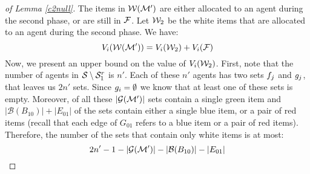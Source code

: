 \begin{proof}[of Lemma \ref{c2null}]
The items in $\mathcal{W}(\mathcal{M}')$ are either allocated to an agent during the second phase, or are still in $\mathcal{F}$. Let $\mathcal{W}_2$ be the white items that are allocated to an agent during the second phase. We have: 
\begin{equation}
V_i(\mathcal{W}(\mathcal{M}')) = V_i(\mathcal{W}_2) + V_i(\mathcal{F})
\end{equation}
Now, we present an upper bound on the value of $V_i(\mathcal{W}_2)$. First, note that the number of agents in $\mathcal{S} \setminus \mathcal{S}^r_1$ is $n'$. Each of these $n'$ agents has two sets $f_j$ and $g_j$, that leaves us $2n'$ sets. Since $g_i = \emptyset$ we know that at least one of these sets is empty. Moreover, of all these $|{\mathcal{G}}(\mathcal{M}')|$ sets contain a single green item and $|{\mathcal{B}}(B_{10})| + |E_{01}|$ of the sets contain either a single blue item, or a pair of red items (recall that each edge of $G_{01}$ refers to a blue item or a pair of red items). Therefore, the number of the sets that contain only white items is at most:
$$2n' - 1 - |{\mathcal{G}}(\mathcal{M}')| - |{\mathcal{B}}(B_{10})| - |E_{01}|$$


\end{proof}
